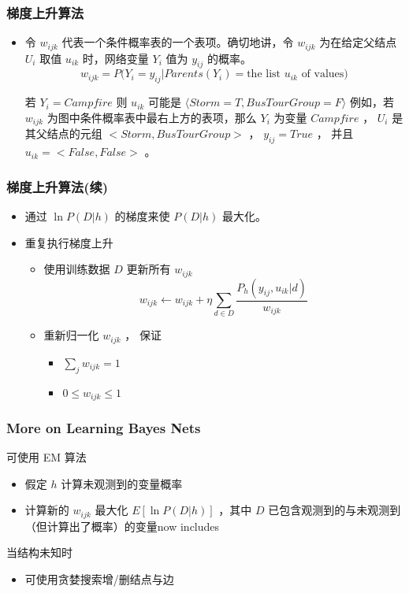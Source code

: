 \documentclass{beamer}
\begin{document}
\begin{frame}
\frametitle{梯度上升算法}
\label{sec-10-9}


\begin{itemize}
\item 令 $w_{ijk}$ 代表一个条件概率表的一个表项。确切地讲，令 $w_{ijk}$  为在给定父结点 $U_i$ 取值 $u_{ik}$ 时，网络变量 $Y_i$ 值为 $y_{ij}$ 的概率。
    $$w_{ijk} = P(Y_i=y_{ij} | Parents(Y_i) = \mbox{the list $u_{ik}$ of values)}$$

    若  $Y_i = Campfire$ 则 $u_{ik}$ 可能是 $\langle Storm=T, BusTourGroup=F \rangle$
    例如，若 $w_{ijk}$ 为图中条件概率表中最右上方的表项，那么 $Y_i$ 为变量 $Campfire$ ， 
    $U_i$ 是其父结点的元组 $<Storm, BusTourGroup>$ ， $y_{ij}=True$ ， 并且 $u_{ik}=<False, False>$ 。
\end{itemize}
\end{frame}
\begin{frame}
\frametitle{梯度上升算法(续)}
\label{sec-10-10}

\begin{itemize}
\item 通过 $\ln P(D|h)$ 的梯度来使 $P(D|h)$ 最大化。
\item 重复执行梯度上升
\begin{itemize}
\item 使用训练数据 $D$ 更新所有 $w_{ijk}$ 
    $$w_{ijk} \leftarrow w_{ijk} + \eta \sum_{d \in D} \frac{P_h(y_{ij}, u_{ik} |d)}{w_{ijk}}$$
\item 重新归一化 $w_{ijk}$ ， 保证
\begin{itemize}
\item $\sum_{j} w_{ijk} = 1$
\item $0 \leq w_{ijk} \leq 1$
\end{itemize}
\end{itemize}
\end{itemize}
\end{frame}
\begin{frame}
\frametitle{More on Learning Bayes Nets}
\label{sec-10-11}


可使用 EM 算法
\begin{itemize}
\item 假定 $h$ 计算未观测到的变量概率
\item 计算新的 $w_{ijk}$ 最大化 $E[\ln P(D|h)]$ ，其中 $D$ 已包含观测到的与未观测到（但计算出了概率）的变量now includes
\end{itemize}

当结构未知时
\begin{itemize}
\item 可使用贪婪搜索增/删结点与边
\end{itemize}
\end{frame}
\end{document}
